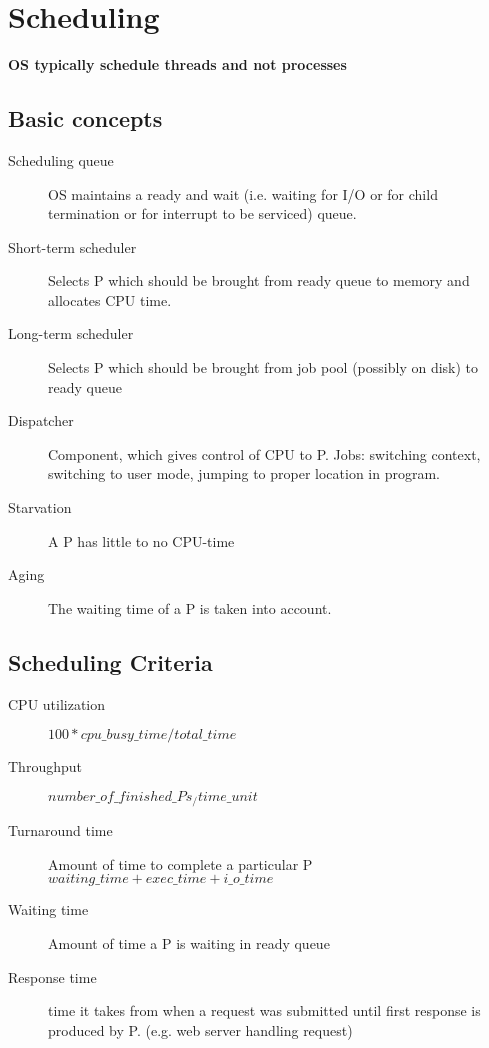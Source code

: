 \section*{Scheduling}
\textbf{OS typically schedule threads and not processes}

\subsection*{Basic concepts}
\begin{description}
  \item[Scheduling queue] OS maintains a ready and wait (i.e. waiting for I/O or for child termination or for interrupt to be serviced) queue.
  \item[Short-term scheduler] Selects P which should be brought from ready queue to memory and allocates CPU time.
  \item[Long-term scheduler] Selects P which should be brought from job pool (possibly on disk) to ready queue
  \item[Dispatcher] Component, which gives control of CPU to P. Jobs: switching context, switching to user mode, jumping to proper location in program.
  \item[Starvation] A P has little to no CPU-time
  \item[Aging] The waiting time of a P is taken into account.
\end{description}

\subsection*{Scheduling Criteria}
\begin{description}
  \item[CPU utilization] $100 * cpu\_busy\_time / total\_time$
  \item[Throughput] $number\_of\_finished\_Ps_/time\_unit$
  \item[Turnaround time] Amount of time to complete a particular P $waiting\_time+exec\_time+i\_o\_time$
  \item[Waiting time] Amount of time a P is waiting in ready queue
  \item[Response time] time it takes from when a request was submitted until first response is produced by P. (e.g. web server handling request)
\end{description}

